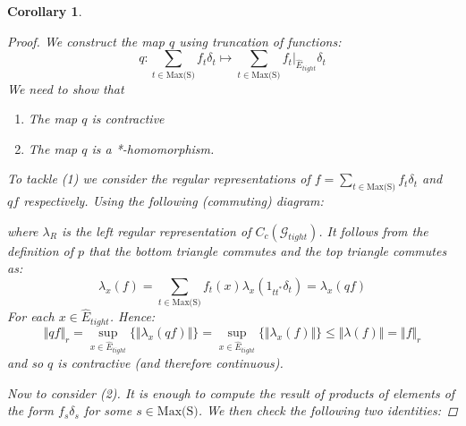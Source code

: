 \documentclass[11pt]{amsart}
\theoremstyle{plain}
\newtheorem{corollary}[theorem]{Corollary}%
\theoremstyle{definition}%
\theoremstyle{remark}%
\newcommand{\G}{\mathcal{G}}
\newcommand{\E}{\widehat{E}}
\begin{document}
\begin{corollary}
\begin{proof}
We construct the map $q$ using truncation of functions:
\begin{equation*}
q: \sum_{t \in \text{Max(S)}} f_{t} \delta_{t} \mapsto \sum_{t \in \text{Max(S)}} f_{t}|_{\E_{tight}} \delta_{t} 
\end{equation*}
We need to show that
\begin{enumerate}
\item The map $q$ is contractive
\item The map $q$ is a *-homomorphism.
\end{enumerate}
To tackle (1) we consider the regular representations of $f = \sum_{t \in \text{Max(S)}} f_{t} \delta_{t}$ and $qf$ respectively. Using the following (commuting) diagram:

\begin{center}
\end{center}

where $\lambda_{R}$ is the left regular representation of $C_{c}(\G_{tight})$. It follows from the definition of $p$ that the bottom triangle commutes and the top triangle commutes as:
\begin{equation*}
\lambda_{x}(f) =\sum_{t \in \text{Max(S)}} f_{t}(x)\lambda_{x}(1_{tt^{*}}\delta_{t}) = \lambda_{x}(qf)
\end{equation*}
For each $x \in \E_{tight}$. Hence:
\begin{equation*}
\Vert qf \Vert_{r} = \sup_{x \in \E_{tight}} \lbrace \Vert \lambda_{x}(qf) \Vert \rbrace = \sup_{x \in \E_{tight}} \lbrace \Vert \lambda_{x}(f) \Vert \rbrace \leq \Vert \lambda(f) \Vert = \Vert f \Vert_{r}
\end{equation*}
and so $q$ is contractive (and therefore continuous).
 
Now to consider (2). It is enough to compute the result of products of elements of the form $f_{s}\delta_{s}$ for some $s \in \text{Max(S)}$. We then check the following two identities:



\end{proof}
\end{corollary}
\end{document}
